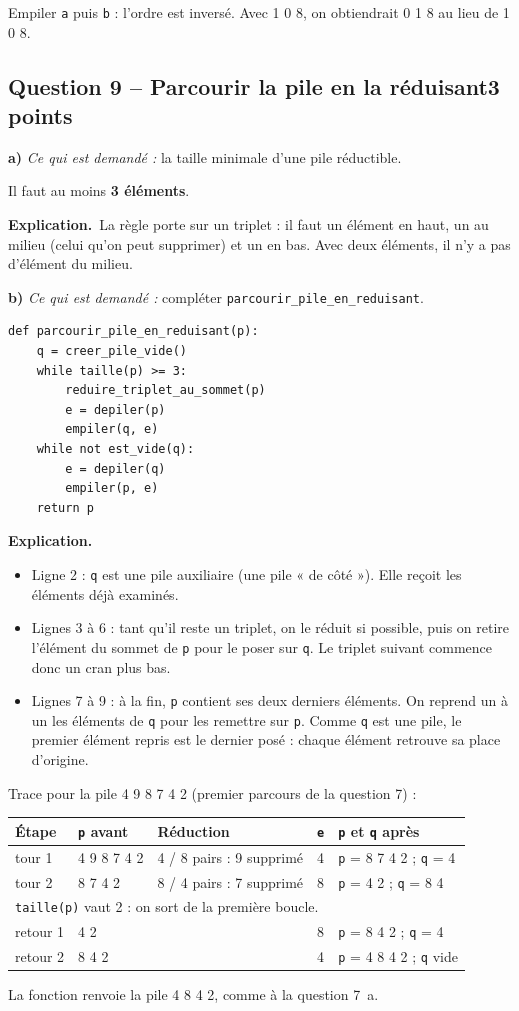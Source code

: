 \documentclass[11pt, a4paper]{exam}
\newcommand{\code}[1]{\texttt{#1}}
\newcommand{\Qt}[2]{\subsection*{#1\hfill{\normalfont\small #2}}}
\newcommand{\rappel}[1]{\noindent\textit{Ce qui est demandé :} #1\par\smallskip}
\newcommand{\explication}{\noindent\textbf{Explication.}\ }
\begin{document}
\begin{erreur}
Empiler \code{a} puis \code{b} : l'ordre est inversé. Avec 1 0 8, on obtiendrait 0 1 8 au lieu de 1 0 8.
\end{erreur}

\Qt{Question 9 -- Parcourir la pile en la réduisant}{3 points}

\textbf{a)} \rappel{la taille minimale d'une pile réductible.}
\begin{reponse}
Il faut au moins \textbf{3 éléments}.
\end{reponse}
\explication La règle porte sur un triplet : il faut un élément en haut, un au milieu (celui qu'on peut supprimer) et un en bas. Avec deux éléments, il n'y a pas d'élément du milieu.

\textbf{b)} \rappel{compléter \code{parcourir\_pile\_en\_reduisant}.}
\begin{reponse}
\begin{lstlisting}
def parcourir_pile_en_reduisant(p):
    q = creer_pile_vide()
    while taille(p) >= 3:
        reduire_triplet_au_sommet(p)
        e = depiler(p)
        empiler(q, e)
    while not est_vide(q):
        e = depiler(q)
        empiler(p, e)
    return p
\end{lstlisting}
\end{reponse}
\explication
\begin{itemize}
\item Ligne 2 : \code{q} est une pile auxiliaire (une pile « de côté »). Elle reçoit les éléments déjà examinés.
\item Lignes 3 à 6 : tant qu'il reste un triplet, on le réduit si possible, puis on retire l'élément du sommet de \code{p} pour le poser sur \code{q}. Le triplet suivant commence donc un cran plus bas.
\item Lignes 7 à 9 : à la fin, \code{p} contient ses deux derniers éléments. On reprend un à un les éléments de \code{q} pour les remettre sur \code{p}. Comme \code{q} est une pile, le premier élément repris est le dernier posé : chaque élément retrouve sa place d'origine.
\end{itemize}

Trace pour la pile 4 9 8 7 4 2 (premier parcours de la question 7) :
\begin{center}\small
\begin{tabular}{|l|l|l|l|l|}\hline
Étape & \code{p} avant & Réduction & \code{e} & \code{p} et \code{q} après \\\hline
tour 1 & 4 9 8 7 4 2 & 4 / 8 pairs : 9 supprimé & 4 & \code{p} = 8 7 4 2 ; \code{q} = 4 \\
tour 2 & 8 7 4 2 & 8 / 4 pairs : 7 supprimé & 8 & \code{p} = 4 2 ; \code{q} = 8 4 \\\hline
\multicolumn{5}{|l|}{\code{taille(p)} vaut 2 : on sort de la première boucle.} \\\hline
retour 1 & 4 2 & & 8 & \code{p} = 8 4 2 ; \code{q} = 4 \\
retour 2 & 8 4 2 & & 4 & \code{p} = 4 8 4 2 ; \code{q} vide \\\hline
\end{tabular}
\end{center}
La fonction renvoie la pile 4 8 4 2, comme à la question 7~a.
\end{document}
